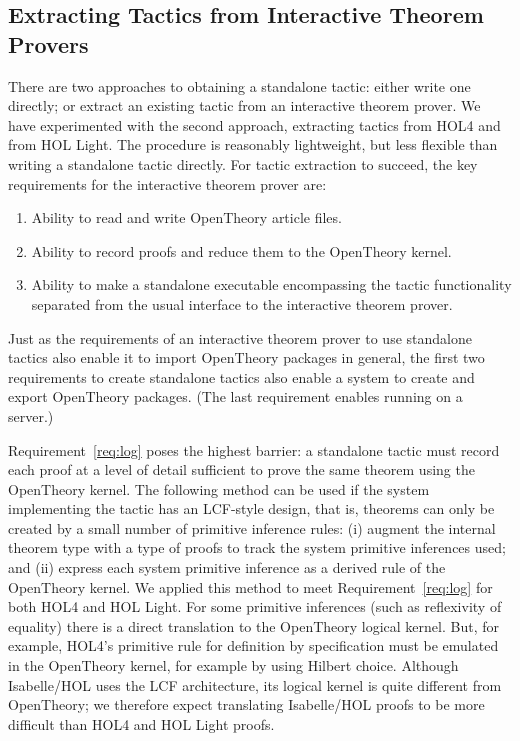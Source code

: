 \documentclass{llncs}
\newcommand{\OpenTheory}{OpenTheory\xspace}
\begin{document}
\subsection{Extracting Tactics from Interactive Theorem Provers}

There are two approaches to obtaining a standalone tactic: either write one directly; or extract an existing tactic from an interactive theorem prover.
We have experimented with the second approach, extracting tactics from HOL4 and from HOL Light.
The procedure is reasonably lightweight, but less flexible than writing a standalone tactic directly.
For tactic extraction to succeed, the key requirements for the interactive theorem prover are:
\begin{enumerate}
\item\label{req:io} Ability to read and write \OpenTheory article files.

\item\label{req:log} Ability to record proofs and reduce them to the \OpenTheory kernel.

\item\label{req:ckpt} Ability to make a standalone executable encompassing the tactic functionality separated from the usual interface to the interactive theorem prover.
\end{enumerate}

Just as the requirements of an interactive theorem prover to use standalone tactics also enable it to import \OpenTheory packages in general, the first two requirements to create standalone tactics also enable a system to create and export \OpenTheory packages.
(The last requirement enables running on a server.)

Requirement~\ref{req:log} poses the highest barrier: a standalone tactic must record each proof at a level of detail sufficient to prove the same theorem using the \OpenTheory kernel.
The following method can be used if the system implementing the tactic has an LCF-style design, that is, theorems can only be created by a small number of primitive inference rules: (i) augment the internal theorem type with a type of proofs to track the system primitive inferences used; and (ii) express each system primitive inference as a derived rule of the \OpenTheory kernel. We applied this method to meet Requirement~\ref{req:log} for both HOL4 and HOL Light. For some primitive inferences (such as reflexivity of equality) there is a direct translation to the \OpenTheory logical kernel.
But, for example, HOL4's primitive rule for definition by specification must be emulated in the \OpenTheory kernel, for example by using Hilbert choice.
Although Isabelle/HOL uses the LCF architecture, its logical kernel is quite different from \OpenTheory; we therefore expect translating Isabelle/HOL proofs to be more difficult than HOL4 and HOL Light proofs.
\end{document}
